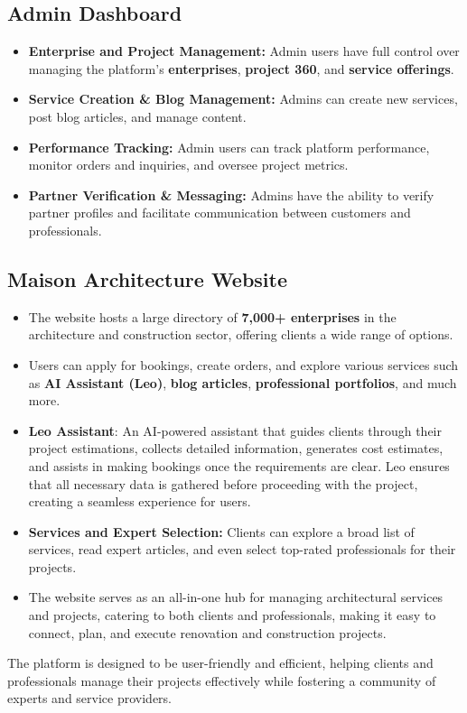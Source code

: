 \subsection{Admin Dashboard}
\begin{itemize}
    \item \textbf{Enterprise and Project Management:} Admin users have full control over managing the platform's \textbf{enterprises}, \textbf{project 360}, and \textbf{service offerings}.
    \item \textbf{Service Creation \& Blog Management:} Admins can create new services, post blog articles, and manage content.
    \item \textbf{Performance Tracking:} Admin users can track platform performance, monitor orders and inquiries, and oversee project metrics.
    \item \textbf{Partner Verification \& Messaging:} Admins have the ability to verify partner profiles and facilitate communication between customers and professionals.
\end{itemize}

\subsection{Maison Architecture Website}
\begin{itemize}
    \item The website hosts a large directory of \textbf{7,000+ enterprises} in the architecture and construction sector, offering clients a wide range of options.
    \item Users can apply for bookings, create orders, and explore various services such as \textbf{AI Assistant (Leo)}, \textbf{blog articles}, \textbf{professional portfolios}, and much more.
    \item \textbf{Leo Assistant}: An AI-powered assistant that guides clients through their project estimations, collects detailed information, generates cost estimates, and assists in making bookings once the requirements are clear. Leo ensures that all necessary data is gathered before proceeding with the project, creating a seamless experience for users.
    \item \textbf{Services and Expert Selection:} Clients can explore a broad list of services, read expert articles, and even select top-rated professionals for their projects.
    \item The website serves as an all-in-one hub for managing architectural services and projects, catering to both clients and professionals, making it easy to connect, plan, and execute renovation and construction projects.
\end{itemize}

The platform is designed to be user-friendly and efficient, helping clients and professionals manage their projects effectively while fostering a community of experts and service providers.